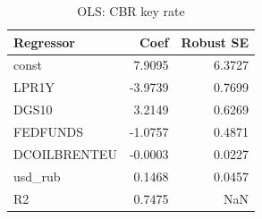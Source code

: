 \begin{table}
\caption{OLS: CBR key rate}
\label{tab:5_6}
\begin{tabular}{lrr}
\toprule
Regressor & Coef & Robust SE \\
\midrule
const & 7.9095 & 6.3727 \\
LPR1Y & -3.9739 & 0.7699 \\
DGS10 & 3.2149 & 0.6269 \\
FEDFUNDS & -1.0757 & 0.4871 \\
DCOILBRENTEU & -0.0003 & 0.0227 \\
usd_rub & 0.1468 & 0.0457 \\
R2 & 0.7475 & NaN \\
\bottomrule
\end{tabular}
\end{table}
